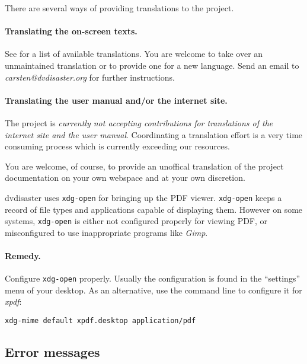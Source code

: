 {There are several ways of providing translations to the project.

  \paragraph{Translating the on-screen texts.} See  for
  a list of available translations. You are welcome to take over an unmaintained
  translation or to provide one for a new language. Send an email to
  {\em carsten@dvdisaster.org} for further instructions.

  \paragraph{Translating the user manual and/or the internet site.} The project
  is {\em currently not accepting contributions for translations of the internet
    site and the user manual}. Coordinating a translation effort is a very time
  consuming process which is currently exceeding our resources. 

  \smallskip
  
  You are welcome, of course, to provide an unoffical translation of the
  project documentation on your own webspace and at your own discretion. }

{dvdisaster uses {\tt xdg-open} for bringing up the PDF viewer. {\tt xdg-open} keeps a record of file types and applications capable of displaying them. However on some systems, {\tt xdg-open} is either not configured properly for viewing PDF, or misconfigured to use inappropriate programs like {\em Gimp}.

  \smallskip

  \paragraph{Remedy.} Configure {\tt xdg-open} properly. Usually the configuration is found in the ``settings'' menu of your desktop. As an alternative, use the command line to configure it for {\em xpdf}:

 \smallskip
  
  {\tt  xdg-mime default xpdf.desktop application/pdf}}



\subsection{Error messages}
\label{qa-error}
\setcounter{qaitem}{0}

